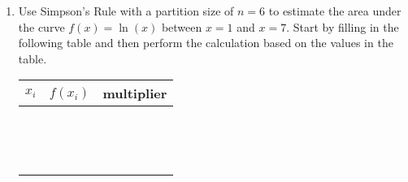 \documentclass[letterpaper,12pt,fleqn]{article}
\begin{document}
\begin{enumerate}[left=0pt]
\item Use Simpson's Rule with a partition size of \(n=6\) to estimate the area under the curve \(f(x)=\ln(x)\)
  between \(x=1\) and \(x=7\).  Start by filling in the following table and then perform the calculation based on
  the values in the table.

  \begin{tabular}{p{1in}|p{1in}|p{1in}}
    \(x_i\) & \(f(x_i)\) & multiplier \\
    \hline
    & & \\
    & & \\
    \hline
    & & \\
    & & \\
    \hline
    & & \\
    & & \\
    \hline
    & & \\
    & & \\
    \hline
    & & \\
    & & \\
    \hline
    & & \\
    & & \\
    \hline
    & & \\
    & &
  \end{tabular}
\end{enumerate}
\end{document}
